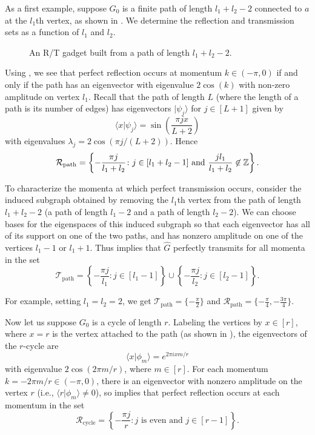 \documentclass[../thesis-main/thesis-main]{subfiles}
\begin{document}
As a first example, suppose $G_0$ is a finite path of length $l_1+l_2-2$ connected to $a$ at the $l_1$th vertex, as shown in .  We determine the reflection and transmission sets as a function of $l_1$ and $l_2$.


\begin{figure}
  \centering
  
  \caption{An R/T gadget built from a path of length $l_1+l_2-2$. }
  \label{fig:RT_path}
\end{figure}


Using , we see that perfect reflection occurs at momentum $k\in (-\pi,0)$ if and only if the path has an eigenvector with eigenvalue $2\cos(k)$ with non-zero amplitude on vertex $l_1$.  Recall that the path of length $L$ (where the length of a path is its number of edges) has eigenvectors $|\psi_j\rangle$ for $j\in [L+1]$ given by
\begin{equation}
  \langle x | \psi_j \rangle = \sin\left(\frac{ \pi j x}{L+2}\right)\label{eq:vecs_line}
\end{equation}
with eigenvalues $\lambda_j = 2 \cos(\pi j/(L+2))$.  Hence
\[
  \mathcal{R}_{\mathrm{path}} = \left\{ -\frac{\pi j}{l_1 + l_2} \colon j\in [l_1 + l_2 - 1] \text{ and } \frac{jl_1}{l_1+l_2} \not\in \mathbb{Z}\right\}.
\]

To characterize the momenta at which perfect transmission occurs, consider the induced subgraph obtained by removing the $l_1$th vertex from the path of length $l_1+l_2-2$ (a path of length $l_1-2$ and a path of length $l_2-2$). We can choose bases for the eigenspaces of this induced subgraph so that each eigenvector has all of its support on one of the two paths, and has nonzero amplitude on one of the vertices $l_1-1$ or $l_1+1$. Thus  implies that $\hat{G}$ perfectly transmits for all momenta in the set
\[
  \mathcal{T}_{\mathrm{path}} = \left\{- \frac{\pi j}{l_1} \colon j\in [l_1-1]\right\} \cup \left\{-\frac{\pi j}{l_2 } \colon j \in [l_2-1]\right\}.
\]

For example, setting $l_1 = l_2 = 2$, we get $\mathcal{T}_{\mathrm{path}} = \{-\frac{\pi}{2}\}$ and $\mathcal{R}_{\mathrm{path}} = \{-\frac{\pi}{4}, -\frac{3\pi}{4}\}$.


Now let us suppose $G_0$ is a cycle of length $r$. Labeling the vertices by $x \in [r]$, where $x=r$ is the vertex attached to the path (as shown in ), the eigenvectors of the $r$-cycle are
\[
  \langle x | \phi_m\rangle = e^{{2 \pi i x m}/{r}}
\]
with eigenvalue $2 \cos(2 \pi m/r)$, where $m\in [r]$. For each momentum $k=-2 \pi m/r \in (-\pi,0)$, there is an eigenvector with nonzero amplitude on the vertex $r$ (i.e., $\langle r | \phi_m\rangle\neq 0$), so  implies that perfect reflection occurs at each momentum in the set
\[
  \mathcal{R}_{\mathrm{cycle}} = \left\{ -\frac{\pi j}{r} \colon \text{$j$ is even and $j\in [r-1]$}\right\}.
\]
\end{document}
